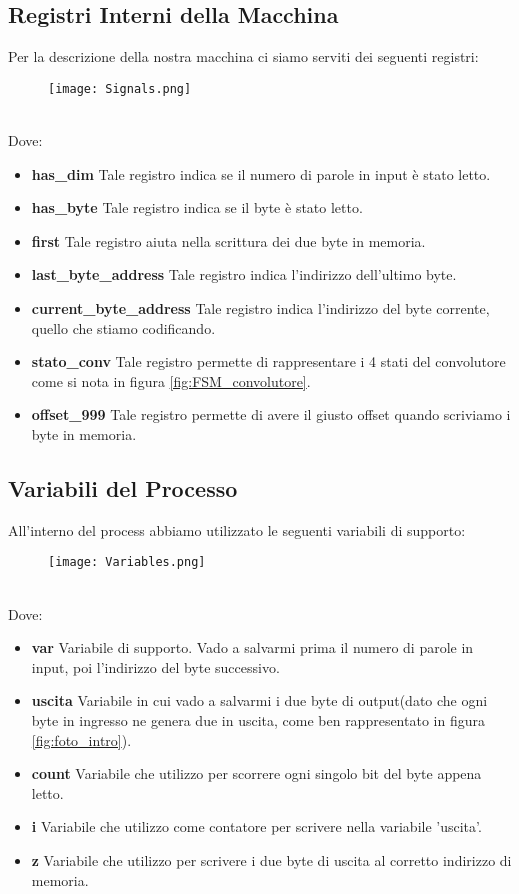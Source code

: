 \documentclass[a4paper]{article}
\begin{document}
\subsection{Registri Interni della Macchina}
Per la descrizione della nostra macchina ci siamo serviti dei seguenti registri:
\begin{figure}[htp]
    \centering
    \texttt{[image: Signals.png]}
    \label{fig:signals}
\end{figure}
\\
%
Dove:
\begin{itemize}
    \item \textbf{has\_dim} Tale registro indica se il numero di parole in input è stato letto.
    \item \textbf{has\_byte} Tale registro indica se il byte è stato letto.
    \item \textbf{first} Tale registro aiuta nella scrittura dei due byte in memoria.
    \item \textbf{last\_byte\_address} Tale registro indica l'indirizzo dell'ultimo byte.
    \item \textbf{current\_byte\_address} Tale registro indica l'indirizzo del byte corrente, quello che stiamo codificando.
    \item \textbf{stato\_conv} Tale registro permette di rappresentare i 4 stati del convolutore come si nota in figura \ref{fig:FSM_convolutore}.
    \item \textbf{offset\_999} Tale registro permette di avere il giusto offset quando scriviamo i byte in memoria.

\end{itemize}

\subsection{Variabili del Processo}
All'interno del process abbiamo utilizzato le seguenti variabili di supporto:
\begin{figure}[htp]
    \centering
    \texttt{[image: Variables.png]}
    \label{fig:variables}
\end{figure}
\\
%
Dove:
\begin{itemize}
    \item \textbf{var} Variabile di supporto. Vado a salvarmi prima il numero di parole in input, poi l'indirizzo del byte successivo.
    \item \textbf{uscita} Variabile in cui vado a salvarmi i due byte di output(dato che ogni byte in ingresso ne genera due in uscita, come ben rappresentato in figura \ref{fig:foto_intro}).
    \item \textbf{count} Variabile che utilizzo per scorrere ogni singolo bit del byte appena letto.
    \item \textbf{i} Variabile che utilizzo come contatore per scrivere nella variabile 'uscita'.
    \item \textbf{z} Variabile che utilizzo per scrivere i due byte di uscita al corretto indirizzo di memoria.

\end{itemize}
\end{document}
